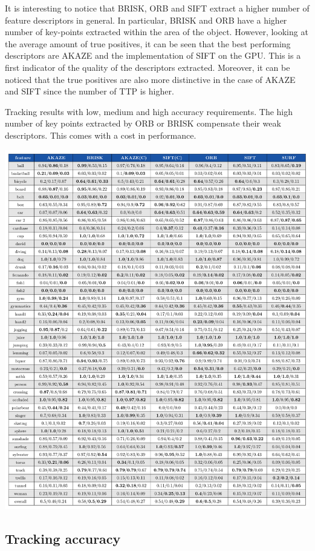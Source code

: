 It is interesting to notice that BRISK, ORB and SIFT extract a higher number of feature descriptors in general. In particular, BRISK and ORB have a higher number of key-points extracted within the area of the object. However, looking at the average amount of true positives, it can be seen that the best performing descriptors are AKAZE and the implementation of SIFT on the GPU. This is a first indicator of the quality of the descriptors extracted. Moreover, it can be noticed that the true positives are also more distinctive in the case of AKAZE and SIFT since the number of TTP is higher.

\begin{table}[t]
\caption{Tracking results with low, medium and high accuracy requirements. The high number of key points extracted by ORB or BRISK compensate their weak descriptors. This comes with a cost in performance.} 
\centerline{%
		\includegraphics[width=\linewidth]{tables/tracking_precision.pdf}}
		\vspace{8mm}
	\label{table:taccuracy}
\end{table}


\subsection{Tracking accuracy}

